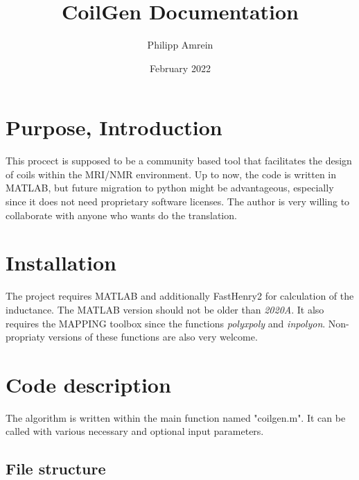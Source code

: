 \documentclass[a4paper,12pt]{book}
\begin{document}
\begin{titlepage}
\author{Philipp Amrein}
\title{CoilGen Documentation}
\date{February 2022}
\end{titlepage}


\maketitle
\tableofcontents

\newpage

\section{{Purpose, Introduction}}
This procect is supposed to be a community based tool that facilitates the design of coils within the MRI/NMR environment.
Up to now, the code is written in MATLAB, but future migration to python might be advantageous, especially since it does not need proprietary software licenses. The author is very willing to collaborate with anyone who wants do the translation.

\section{Installation}
The project requires MATLAB and additionally FastHenry2 for calculation of the inductance.  The MATLAB version should not be older than \textit{2020A}. It also requires the MAPPING toolbox since the functions \textit{polyxpoly} and \textit{inpolyon}. Non-propriaty versions of these functions are also very welcome.

\section{Code description}
The algorithm is written within the main function named "coilgen.m". It can be called with various necessary and optional input parameters.



\subsection{File structure}
\end{document}
